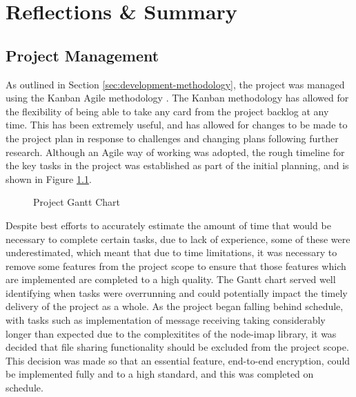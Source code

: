 \chapter{Reflections \& Summary}




\section{Project Management}\label{sec:reflection-on-planning}

As outlined in Section \ref{sec:development-methodology}, the project was managed using the Kanban Agile methodology \cite{stellman2014learning}. The Kanban methodology has allowed for the flexibility of being able to take any card from the project backlog at any time. This has been extremely useful, and has allowed for changes to be made to the project plan in response to challenges and changing plans following further research. Although an Agile way of working was adopted, the rough timeline for the key tasks in the project was established as part of the initial planning, and is shown in Figure \ref{fig:gantt}.

\begin{figure}[h!]
  \centering
  \caption{Project Gantt Chart}
  \label{fig:gantt}
\end{figure}

Despite best efforts to accurately estimate the amount of time that would be necessary to complete certain tasks, due to lack of experience, some of these were underestimated, which meant that due to time limitations, it was necessary to remove some features from the project scope to ensure that those features which are implemented are completed to a high quality. The Gantt chart served well identifying when tasks were overrunning and could potentially impact the timely delivery of the project as a whole. As the project began falling behind schedule, with tasks such as implementation of message receiving taking considerably longer than expected due to the complexitites of the node-imap library, it was decided that file sharing functionality should be excluded from the project scope. This decision was made so that an essential feature, end-to-end encryption, could be implemented fully and to a high standard, and this was completed on schedule.

